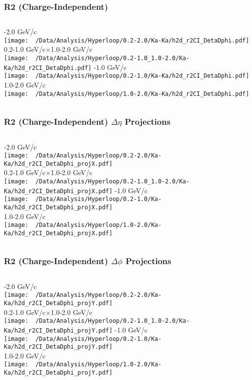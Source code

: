 \documentclass{beamer}
\begin{document}
\begin{frame}
	\frametitle{R2 (Charge-Independent)}
	\begin{columns}
		-2.0 GeV/c\\
		\texttt{[image: ~/Data/Analysis/Hyperloop/0.2-2.0/Ka-Ka/h2d\_r2CI\_DetaDphi.pdf]}\\0.2-1.0 GeV/c$\times$1.0-2.0 GeV/c\\
		\texttt{[image: ~/Data/Analysis/Hyperloop/0.2-1.0\_1.0-2.0/Ka-Ka/h2d\_r2CI\_DetaDphi.pdf]}
		-1.0 GeV/c\\
		\texttt{[image: ~/Data/Analysis/Hyperloop/0.2-1.0/Ka-Ka/h2d\_r2CI\_DetaDphi.pdf]}\\1.0-2.0 GeV/c\\
		\texttt{[image: ~/Data/Analysis/Hyperloop/1.0-2.0/Ka-Ka/h2d\_r2CI\_DetaDphi.pdf]}
	\end{columns}
\end{frame}
\begin{frame}
	\frametitle{R2 (Charge-Independent) $\Delta\eta$ Projections}
	\begin{columns}
		\column{0.5\textwidth}
		-2.0 GeV/c\\
		\texttt{[image: ~/Data/Analysis/Hyperloop/0.2-2.0/Ka-Ka/h2d\_r2CI\_DetaDphi\_projX.pdf]}\\0.2-1.0 GeV/c$\times$1.0-2.0 GeV/c\\
		\texttt{[image: ~/Data/Analysis/Hyperloop/0.2-1.0\_1.0-2.0/Ka-Ka/h2d\_r2CI\_DetaDphi\_projX.pdf]}
		\column{0.5\textwidth}
		-1.0 GeV/c\\
		\texttt{[image: ~/Data/Analysis/Hyperloop/0.2-1.0/Ka-Ka/h2d\_r2CI\_DetaDphi\_projX.pdf]}\\1.0-2.0 GeV/c\\
		\texttt{[image: ~/Data/Analysis/Hyperloop/1.0-2.0/Ka-Ka/h2d\_r2CI\_DetaDphi\_projX.pdf]}
	\end{columns}
\end{frame}
\begin{frame}
	\frametitle{R2 (Charge-Independent) $\Delta\phi$ Projections}
	\begin{columns}
		-2.0 GeV/c\\
		\texttt{[image: ~/Data/Analysis/Hyperloop/0.2-2.0/Ka-Ka/h2d\_r2CI\_DetaDphi\_projY.pdf]}\\0.2-1.0 GeV/c$\times$1.0-2.0 GeV/c\\
		\texttt{[image: ~/Data/Analysis/Hyperloop/0.2-1.0\_1.0-2.0/Ka-Ka/h2d\_r2CI\_DetaDphi\_projY.pdf]}
		-1.0 GeV/c\\
		\texttt{[image: ~/Data/Analysis/Hyperloop/0.2-1.0/Ka-Ka/h2d\_r2CI\_DetaDphi\_projY.pdf]}\\1.0-2.0 GeV/c\\
		\texttt{[image: ~/Data/Analysis/Hyperloop/1.0-2.0/Ka-Ka/h2d\_r2CI\_DetaDphi\_projY.pdf]}
	\end{columns}
\end{frame}
\end{document}
